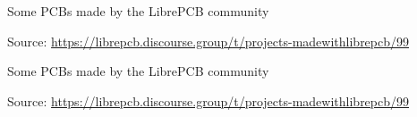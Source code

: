\begin{frame}[noframenumbering]{\secname}

  Some PCBs made by the LibrePCB community \faChild\faChild\faChild

  \begin{center}

    \tiny Source:
    \url{https://librepcb.discourse.group/t/projects-madewithlibrepcb/99}
  \end{center}

\end{frame}

\begin{frame}[noframenumbering]{\secname}

  Some PCBs made by the LibrePCB community \faChild\faChild\faChild

  \begin{center}

    \tiny Source:
    \url{https://librepcb.discourse.group/t/projects-madewithlibrepcb/99}
  \end{center}

\end{frame}

